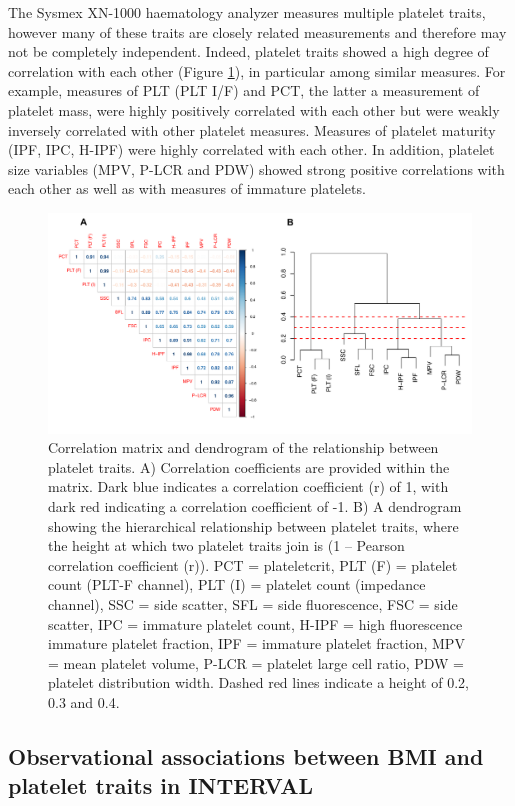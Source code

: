\documentclass[11pt,twoside]{bristolthesis}
\begin{document}
The Sysmex XN-1000 haematology analyzer measures multiple platelet traits, however many of these traits are closely related measurements and therefore may not be completely independent. Indeed, platelet traits showed a high degree of correlation with each other (Figure \ref{fig:Corr-mat-dend}), in particular among similar measures. For example, measures of PLT (PLT I/F) and PCT, the latter a measurement of platelet mass, were highly positively correlated with each other but were weakly inversely correlated with other platelet measures. Measures of platelet maturity (IPF, IPC, H-IPF) were highly correlated with each other. In addition, platelet size variables (MPV, P-LCR and PDW) showed strong positive correlations with each other as well as with measures of immature platelets.
\begin{figure}
\includegraphics[width=0.85\linewidth,height=0.5\textheight]{figure/BMI_platelets/Corrmatrix_dendrogram} \caption[Correlation matrix and dendrogram of the relationship between platelet traits.]{Correlation matrix and dendrogram of the relationship between platelet traits. A) Correlation coefficients are provided within the matrix. Dark blue indicates a correlation coefficient (r) of 1, with dark red indicating a correlation coefficient of -1. B) A dendrogram showing the hierarchical relationship between platelet traits, where the height at which two platelet traits join is (1 – Pearson correlation coefficient (r)). PCT = plateletcrit, PLT (F) = platelet count (PLT-F channel), PLT (I) = platelet count (impedance channel), SSC = side scatter, SFL = side fluorescence, FSC = side scatter, IPC = immature platelet count, H-IPF = high fluorescence immature platelet fraction, IPF = immature platelet fraction, MPV = mean platelet volume, P-LCR = platelet large cell ratio, PDW = platelet distribution width. Dashed red lines indicate a height of 0.2, 0.3 and 0.4.}\label{fig:Corr-mat-dend}
\end{figure}
\hypertarget{observational-associations-between-bmi-and-platelet-traits-in-interval}{%
\subsection{Observational associations between BMI and platelet traits in INTERVAL}\label{observational-associations-between-bmi-and-platelet-traits-in-interval}}
\end{document}
